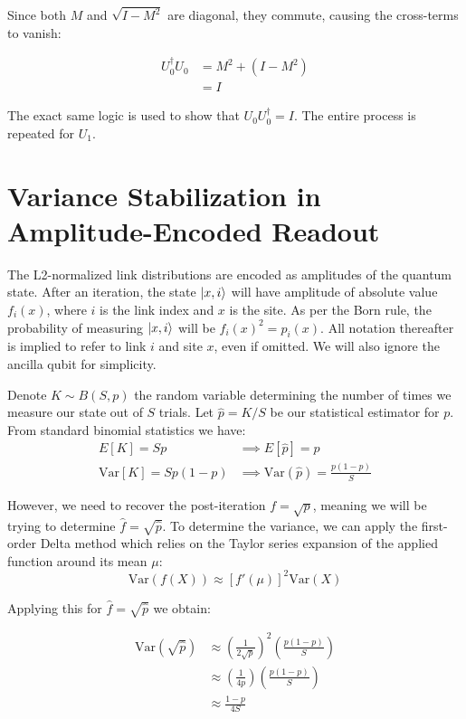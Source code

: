 Since both $M$ and $\sqrt{I-M^2}$ are diagonal, they commute, causing the cross-terms to vanish:

\begin{align*}
    U_0^\dagger U_0 &= M^2 + (I - M^2) \\
    &= I
\end{align*}

The exact same logic is used to show that $U_0 U_{0}^\dagger = I$.
The entire process is repeated for $U_1$.

\section{Variance Stabilization in Amplitude-Encoded Readout}
\label{app:variance_stabilization}


The L2-normalized link distributions are encoded as amplitudes of the quantum state. 
After an iteration, the state $\ket{x,i}$ will have amplitude of absolute value $f_i(x)$, where $i$ is the link index and $x$ is the site.
As per the Born rule, the probability of measuring $\ket{x,i}$ will be $f_i(x)^2 = p_i(x)$. 
All notation thereafter is implied to refer to link $i$ and site $x$, even if omitted. We will also ignore the ancilla qubit for simplicity.

Denote $K \sim B(S,p)$ the random variable determining the number of times we measure our state out of $S$ trials.
Let $\hat{p} = K/S$ be our statistical estimator for $p$. From standard binomial statistics we have:
\begin{align*}
    E[K] = Sp &\implies E[\hat{p}] = p \\
    \text{Var}[K] = Sp(1-p) &\implies \text{Var}(\hat{p}) = \frac{p(1 - p)}{S}
\end{align*}

However, we need to recover the post-iteration $f = \sqrt{p}$, meaning we will be trying to determine $\hat{f} = \sqrt{\hat{p}}$.
To determine the variance, we can apply the first-order Delta method \cite{casella2002statistical} which relies on the Taylor series expansion of the applied function around its mean $\mu$:
\begin{equation*}
    \text{Var}(f(X)) \approx \left[ f'(\mu) \right]^2 \text{Var}(X)
\end{equation*}

Applying this for $\hat{f} = \sqrt{\hat{p}}$ we obtain:

\begin{align*}
      \text{Var}\left(\sqrt{\hat{p}}\right) &\approx \left( \frac{1}{2\sqrt{p}} \right)^2 \left( \frac{p(1 - p)}{S} \right) \nonumber \\
    &\approx \left( \frac{1}{4p} \right) \left( \frac{p(1 - p)}{S} \right) \nonumber \\
    &\approx \frac{1 - p}{4S}
\end{align*}

